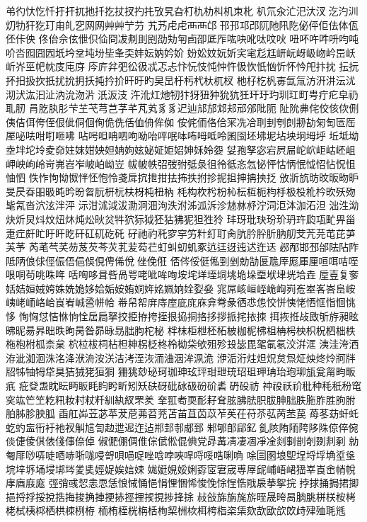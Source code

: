 弚彴忕忔忏扜扞扤扡扦扢扙扠扚扥攷旯旮朾朹朸朻机朿朼
朳氘汆汒汜汏汊汔汋汌灱牞犴犵玎甪癿穵⽹网⾋艸艼芀
艽艿⾌虍⾑襾邙邗邘邛邔阢阤阠阣佖伻佢佉体佤伾佧佒
佟佁佘伭伳伿佡冏冹刜刞刡劭劮匉卣卲厎厏吰吷吪呔呅吙
吜吥吘吽呏呁吨吤呇囮囧囥坁坅坌坉坋坒夆奀妦妘妠妗妎
妢妐妏妧妡宎宒尨尪岍岏岈岋岉岒岊岆岓岕巠帊帎庋庉庌
庈庍弅弝彸彶忒忑忐忭忨忮忳忡忤忣忺忯忷忻怀忴戺抃抌
抎抏抔抇扱扻扺扰抁抈扷扽扲扴旰旴旳旲旵杅杇杙杕杌杈
杝杍杚杋毐氙氚汸汧汫沄沋沏汱汯汩沚汭沇沕沜汦汳汥
汻沎灴灺牣犿犽狃狆狁犺狅玕玗玓玔玒町甹疔疕皁礽耴肕
肙肐肒肜芐芏芅芎芑芓芊芃芄⾘豸迉辿邟邡邥邞邧邠阰阨
阯阭丳侘佼侅佽侀侇佶佴侉侄佷佌侗佪侚佹侁佸侐侜侔侞
侒侂侕佫佮冞冼冾刵刲刳剆刱劼匊匋匼厒厔咇呿咁咑咂咈
呫呺呾呥呬呴呦咍呯呡呠咘呣呧呤囷囹坯坲坭坫坱坰坶垀
坵坻坳坴坢坨坽夌奅妵妺姏姎妲姌姁妶妼姃姖妱妽姀姈妴
姇孢孥宓宕屄屇岮岤岠岵岯岨岬岟岣岭岢岪岧岝岥岶岰岦
帗帔帙弨弢弣弤彔徂彾彽忞忥怭怦怙怲怋怴怊怗怳怚怞怬
怢怍怐怮怓怑怌怉怜戔戽抭抴拑抾抪抶拊抮抳抯抻抩抰抸
攽斨斻昉旼昄昒昈旻昃昋昍昅旽昑昐曶朊枅杬枎枒杶杻枘
枆构杴枍枌杺枟枑枙枃杽极杸杹枔欥殀歾毞氝沓泬泫泮泙
沶泔沭泧沷泐泂沺泃泆泭泲泒泝沴沊沝沀泞泀洰泍泇沰泹
泏泩泑炔炘炅炓炆炄炑炖炂炚炃牪狖狋狘狉狜狒狔狚狌狑
玤玡玭玦玢玠玬玝瓝瓨甿畀甾疌疘皯盳盱盰盵矸矼矹矻矺
矷祂礿秅穸穻竻籵糽耵肏肮肣肸肵肭舠芠苀芫芚芘芛芵芧
芮芼芞芺芴芨芡芩苂芤苃芶芢虰虯虭虮豖迒迋迓迍迖迕迗
邲邴邯邳邰阹阽阼阺陃俍俅俓侲俉俋俁俔俜俙侻侳俛俇
俖侺俀侹俬剄剉勀勂匽卼厗厖厙厘咺咡咭咥哏哃茍咷咮哖
咶哅哆咠呰咼咢咾呲哞咰垵垞垟垤垌垗垝垛垔垘垏垙垥垚
垕壴复奓姡姞姮娀姱姝姺姽姼姶姤姲姷姛姩姳姵姠姾姴姭
宨屌峐峘峌峗峋峛峞峚峉峇峊峖峓峔峏峈峆峎峟峸巹帡帢
帣帠帤庰庤庢庛庣庥弇弮彖徆怷怹恔恲恞恅恓恇恉恛恌恀
恂恟怤恄恘恦恮扂扃拏挍挋拵挎挃拫拹挏挌拸拶挀挓挔拺
挕拻拰敁敃斪斿昶昡昲昵昜昦昢昳昫昺昝昴昹昮朏朐柁柲
柈枺柜枻柸柘柀枷柅柫柤柟枵柍枳柷柶柮柣柂枹柎柧柰枲
柼柆柭柌枮柦柛柺柉柊柃柪柋欨殂殄殶毖毘毠氠氡洨洴洭
洟洼洿洒洊泚洳洄洙洺洚洑洀洝浂洁洘洷洃洏浀洇洠洬洈
洢洉洐炷炟炾炱炰炡炴炵炩牁牉牊牬牰牳牮狊狤狨狫狟狪
狦狣玅珌珂珈珅玹玶玵玴珫玿珇玾珃珆玸珋瓬瓮甮畇畈疧
疪癹盄眈眃眄眅眊盷盻盺矧矨砆砑砒砅砐砏砎砉砃砓祊
祌祋祅祄秕种秏秖秎窀穾竑笀笁籺籸籹籿粀粁紃紈紁罘羑
羍羾耇耎耏耔耷胘胇胠胑胈胂胐胅胣胙胜胊胕胉胏胗胦胍
臿舡芔苙苾苹茇苨茀苕茺苫苖苴苬苡苲苵茌苻苶苰苪苤苠
苺苳苭虷虴虼虳衁衎衧衪衩觓訄訇赲迣迡迮迠郱邽邿郕郅
邾郇郋郈釔釓陔陏陑陓陊陎倞倅倇倓倢倰倛俵俴倳倷倬
俶俷倗倜倠倧倵倯倱倎党冔冓凊凄凅凈凎剡剚剒剞剟剕剢
勍匎厞唦哢唗唒哧哳哤唚哿唄唈哫唑唅哱唊哻哷哸哠唎唃
唋圁圂埌堲埕埒垺埆垽垼垸垶垿埇埐垹埁夎奊娙娖娭娮娕
娏娗娊娞娳孬宧宭宬尃屖屔峬峿峮峱峷崀峹帩帨庨庮庪庬
弳弰彧恝恚恧恁悢悈悀悒悁悝悃悕悛悗悇悜悎戙扆拲挐捖
挬捄捅挶捃揤挹捋捊挼挩捁挴捘捔捙挭捇挳捚捑挸捗捀捈
敊敆旆旃旄旂晊晟晇晑朒朓栟栚桉栲栳栻桋桏栖栱栜栵栫
栭栯桎桄栴栝栒栔栦栨栮桍栺栥栠欬欯欭欱欴歭肂殈毦毤
